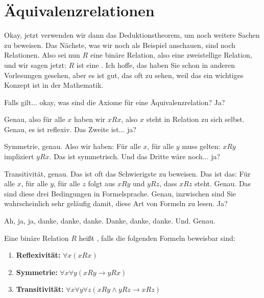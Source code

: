 \section{Äquivalenzrelationen}

\begin{spoken-clean}[00:51:38 - 00:54:25]
Okay, jetzt verwenden wir dann das Deduktionstheorem, um noch weitere Sachen zu beweisen. Das Nächste, was wir noch als Beispiel anschauen, sind noch Relationen. Also sei nun $R$ eine binäre Relation, also eine zweistellige Relation, und wir sagen jetzt: $R$ ist eine . Ich hoffe, das haben Sie schon in anderen Vorlesungen gesehen, aber es ist gut, das oft zu sehen, weil das ein wichtiges Konzept ist in der Mathematik.

Falls gilt... okay, was sind die Axiome für eine Äquivalenzrelation? Ja?


Genau, also für alle $x$ haben wir $x R x$, also $x$ steht in Relation zu sich selbst. Genau, es ist reflexiv. Das Zweite ist... ja?


Symmetrie, genau. Also wir haben: Für alle $x$, für alle $y$ muss gelten: $x R y$ impliziert $y R x$. Das ist symmetrisch. Und das Dritte wäre noch... ja?


Transitivität, genau. Das ist oft das Schwierigste zu beweisen. Das ist das: Für alle $x$, für alle $y$, für alle $z$ folgt aus $x R y$ und $y R z$, dass $x R z$ steht. Genau. Das sind diese drei Bedingungen in Formelsprache. Genau, inzwischen sind Sie wahrscheinlich sehr geläufig damit, diese Art von Formeln zu lesen. Ja?


Ah, ja, ja, danke, danke, danke. Danke, danke, danke. Und. Genau.
\end{spoken-clean}

\begin{math-stroke}
Eine binäre Relation $R$ heißt , falls die folgenden Formeln beweisbar sind:
\begin{enumerate}[label=\textbf{(\arabic*)}]
    \item \textbf{Reflexivität:} $\forall x (x R x)$
    \item \textbf{Symmetrie:} $\forall x \forall y (x R y \rightarrow y R x)$
    \item \textbf{Transitivität:} $\forall x \forall y \forall z (x R y \wedge y R z \rightarrow x R z)$
\end{enumerate}
\end{math-stroke}


